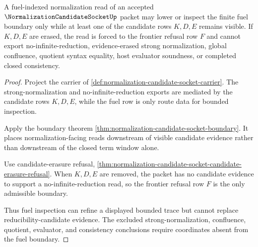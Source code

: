 \begin{theorem}
\label{thm:normalization-candidate-socket-fuel-boundary-candidate-gate}
A fuel-indexed normalization read of an accepted $\NormalizationCandidateSocketUp$ packet may lower or inspect the finite fuel boundary only while at least one of the candidate rows $K,D,E$ remains visible. If $K,D,E$ are erased, the read is forced to the frontier refusal row $F$ and cannot export no-infinite-reduction, evidence-erased strong normalization, global confluence, quotient syntax equality, host evaluator soundness, or completed closed consistency.
\end{theorem}
\begin{proof}
Project the carrier of \autoref{def:normalization-candidate-socket-carrier}. The strong-normalization and no-infinite-reduction exports are mediated by the candidate rows $K,D,E$, while the fuel row is only route data for bounded inspection.

Apply the boundary theorem \autoref{thm:normalization-candidate-socket-boundary}. It places normalization-facing reads downstream of visible candidate evidence rather than downstream of the closed term window alone.

Use candidate-erasure refusal, \autoref{thm:normalization-candidate-socket-candidate-erasure-refusal}. When $K,D,E$ are removed, the packet has no candidate evidence to support a no-infinite-reduction read, so the frontier refusal row $F$ is the only admissible boundary.

Thus fuel inspection can refine a displayed bounded trace but cannot replace reducibility-candidate evidence. The excluded strong-normalization, confluence, quotient, evaluator, and consistency conclusions require coordinates absent from the fuel boundary.
\end{proof}

